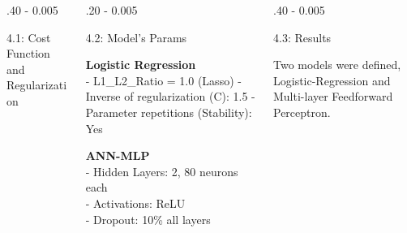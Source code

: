 \documentclass{postertheme}\usepackage[]{graphicx}\usepackage[]{color}
\begin{document}
\begin{frame}
\begin{columns}[onlytextwidth]
\begin{column}{.40 \textwidth - 0.005 \textwidth}
\begin{block}{4.1: Cost Function and Regularization}
    \end{block}
  \end{column}

    \begin{column}{.20 \textwidth - 0.005 \textwidth}
      \begin{block}{4.2: Model's Params } \footnotesize
    
        \textbf{Logistic Regression} \\
        - L1\_L2\_Ratio = 1.0 (Lasso)
        - Inverse of regularization (C): 1.5
        - Parameter repetitions (Stability): Yes
        
        \textbf{ANN-MLP} \\
        - Hidden Layers: 2, 80 neurons each \\
        - Activations: ReLU \\
        - Dropout: 10\% all layers \\
      
      \end{block}
    \end{column}
    
  \begin{column}{.40 \textwidth - 0.005 \textwidth}
    \begin{block}{4.3: Results} \footnotesize
    
      Two models were defined, Logistic-Regression and Multi-layer Feedforward Perceptron. 
      

\end{block}
\end{column}
\end{columns}
\end{frame}
\end{document}
